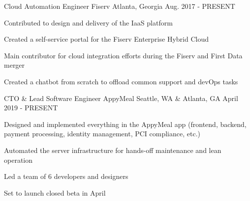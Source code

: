


\begin{cventries}


\cventry
{Cloud Automation Engineer} %
{Fiserv} %
{Atlanta, Georgia} %
{Aug. 2017 - PRESENT} %
{ %
\begin{cvitems}
\item {Contributed to design and delivery of the IaaS platform}
\item {Created a self-service portal for the Fiserv Enterprise Hybrid Cloud}
\item {Main contributor for cloud integration efforts during the Fiserv and First Data merger}
\item {Created a chatbot from scratch to offload common support and devOps tasks}
\end{cvitems}
}


\cventry
{CTO \& Lead Software Engineer} %
{AppyMeal} %
{Seattle, WA \& Atlanta, GA} %
{April 2019 - PRESENT} %
{ %
\begin{cvitems}
\item {Designed and implemented everything in the AppyMeal app (frontend, backend, payment processing, \newline identity management, PCI compliance, etc.)}
\item {Automated the server infrastructure for hands-off maintenance and lean operation}
\item {Led a team of 6 developers and designers}
\item {Set to launch closed beta in April}
\end{cvitems}
}



\end{cventries}

